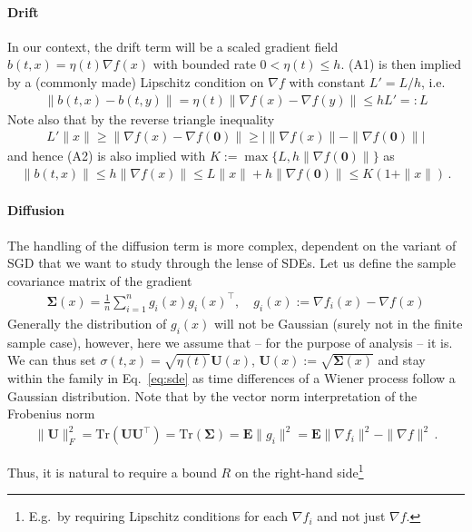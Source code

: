 \documentclass{article}
\newcommand{\E}{{\mathbf E}}
\newcommand{\mSigma}{{\mathbf \Sigma}}
\begin{document}
\paragraph{Drift} 
In our context, the drift term will be a scaled gradient field $b(t,x) = \eta(t) \nabla f(x)$ with bounded rate $0<\eta(t) \le h$. (A1) is then implied by a (commonly made) Lipschitz condition on $\nabla f$ with constant $L' = L/h$, i.e.
\begin{align}
\| b(t,x) - b(t,y) \|  = \eta(t) \| \nabla f(x) - \nabla f(y) \| \le h L' =: L 
\end{align}
Note also that by the reverse triangle inequality
\begin{align}
L' \| x\| \ge \| \nabla f(x) - \nabla f(\mathbf 0) \| \ge |  \| \nabla f(x)\| - \| \nabla f(\mathbf 0) \| |
\end{align}
and hence (A2) is also implied with $K := \max\{L,h \| \nabla f(\mathbf 0)\| \}$ as
\begin{align}
\| b(t,x) \| \le h \| \nabla f(x)\| \le L \| x\| +  h \| \nabla f(\mathbf 0)\| \le K (1+\|x\|)\,.
\end{align}


\paragraph{Diffusion} The handling of the diffusion term is more complex, dependent on the variant of SGD that we want to study through the lense of SDEs. Let us define the sample covariance matrix of the gradient 
\begin{align} 
\mSigma(x) = \frac 1n \sum_{i=1}^n g_i(x) g_i(x)^\top, \quad g_i(x) := \nabla f_i(x) - \nabla f(x)
\end{align}
Generally the distribution of $g_i(x)$ will not be Gaussian (surely not in the finite sample case), however, here we assume that -- for the purpose of analysis -- it is. We can thus set $\sigma(t,x) = \sqrt{\eta(t)} \mathbf U(x)$, $\mathbf U(x) := \sqrt{\mSigma(x)}$ and stay within the family in Eq.~\eqref{eq:sde} as time differences of a Wiener process follow a  Gaussian distribution. Note that by the vector norm interpretation of the Frobenius norm 
\begin{align}
\| \mathbf U \|^2_F = \text{Tr}(\mathbf U \mathbf U^\top) = \text{Tr}(\mSigma) = \E \| g_i\|^2 = \E \| \nabla f_i\|^2  - \| \nabla f\|^2 \,.
\end{align}

\newpage
Thus, it is natural to require a bound $R$ on the right-hand side\footnote{E.g.~by requiring Lipschitz conditions for each $\nabla f_i$  and not just $\nabla f$.} 
\newpage
\end{document}
